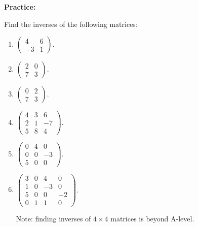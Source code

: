 \documentclass{article}
\begin{document}
\clearpage


\textbf{Practice:}\bigskip

Find the inverses of the following matrices:

\begin{enumerate}
	\item $\left(\begin{array}{cc}4&6\\-3&1\end{array}\right)$.
	\item $\left(\begin{array}{cc}2&0\\7&3\end{array}\right)$.
	\item $\left(\begin{array}{cc}0&2\\7&3\end{array}\right)$.
	\item $\left(\begin{array}{ccc}4&3&6\\2&1&-7\\5&8&4\end{array}\right)$.
	\item $\left(\begin{array}{ccc}0&4&0\\0&0&-3\\5&0&0\end{array}\right)$.
	\item $\left(\begin{array}{cccc}3&0&4&0\\1&0&-3&0\\5&0&0&-2\\0&1&1&0\end{array}\right)$.
	
		Note: finding inverses of $4\times 4$ matrices is beyond A-level.
\end{enumerate}
\end{document}
